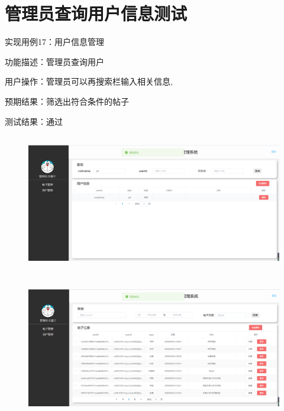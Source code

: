 \section{管理员查询用户信息测试}
实现用例17：用户信息管理

功能描述：管理员查询用户

   
用户操作：管理员可以再搜索栏输入相关信息,

预期结果：筛选出符合条件的帖子

测试结果：通过
\begin{figure}[htbp]
    \centering
    \begin{minipage}[t]{0.9\textwidth}
    \centering
    \includegraphics[width=12cm,height=6cm]{test/image/adm3.png} 
    \end{minipage}
    \end{figure}
    \begin{figure}[htbp]
        \centering
        \begin{minipage}[t]{0.9\textwidth}
        \centering
        \includegraphics[width=12cm,height=6cm]{test/image/adm4.png} 
        \end{minipage}
        \end{figure}
        \newpage         
